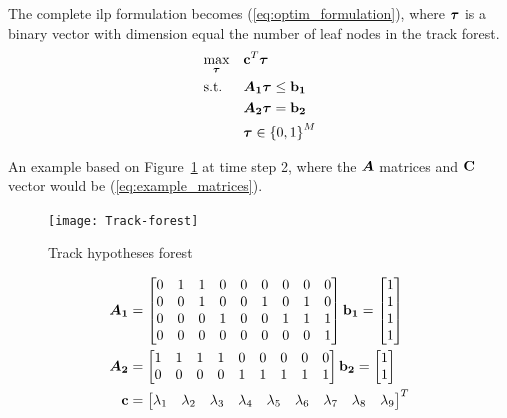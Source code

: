 The complete \gls{ilp} formulation becomes (\ref{eq:optim_formulation}), where \(\boldsymbol{\mathbf{\tau}}\) is a binary vector with dimension equal the number of leaf nodes in the track forest.
\begin{equation}
\begin{aligned}
&	\underset{\boldsymbol{\mathbf{\tau}}}{\text{max}}
&&	\boldsymbol{\mathbf{c}}^T \boldsymbol{\mathbf{\tau}} \\
&	\text{s.t.}
&&	\bm{A_1} \boldsymbol{\mathbf{\tau}} \leq \boldsymbol{\mathbf{b_1}} 	\\
&&&	\bm{A_2} \boldsymbol{\mathbf{\tau}} = \boldsymbol{\mathbf{b_2}}	\\
&&&	\boldsymbol{\mathbf{\tau}} \in {\{0,1\}}^{M}
\end{aligned}
\label{eq:optim_formulation}
\end{equation}

An example based on Figure~\ref{fig:hyp_forest} at time step 2, where the \(\bm{A}\) matrices and \(\boldsymbol{\mathbf{C}}\) vector would be (\ref{eq:example_matrices}).
\begin{figure}[H]
\centering
\texttt{[image: Track-forest]}
\caption{Track hypotheses forest}\label{fig:hyp_forest}
\end{figure}

\begin{equation}
\begin{split}
\bm{A_1} &=\begin{bmatrix}
		0 & 1 & 1 & 0 & 0 & 0 & 0 & 0 & 0 \\
       	0 & 0 & 1 & 0 & 0 & 1 & 0 & 1 & 0 \\
       	0 & 0 & 0 & 1 & 0 & 0 & 1 & 1 & 1 \\
       	0 & 0 & 0 & 0 & 0 & 0 & 0 & 0 & 1 \\
     	\end{bmatrix}
\boldsymbol{\mathbf{b_1}} = 	\begin{bmatrix}
			1 \\ 1  \\ 1 \\ 1
			\end{bmatrix} \\
\bm{A_2} &=\begin{bmatrix}
		1 & 1 & 1 & 1 & 0 & 0 & 0 & 0 & 0 \\
       	0 & 0 & 0 & 0 & 1 & 1 & 1 & 1 & 1 \\
     	\end{bmatrix} 
\boldsymbol{\mathbf{b_2}} = 	\begin{bmatrix}
			1 \\ 1
			\end{bmatrix} \\
\boldsymbol{\mathbf{c}} &=\begin{bmatrix}
		\lambda_1 & \lambda_2 & \lambda_3 & \lambda_4 & \lambda_5 & \lambda_6 & \lambda_7 & \lambda_8 & \lambda_9
		\end{bmatrix}^T \\
\end{split}
\label{eq:example_matrices}
\end{equation}


